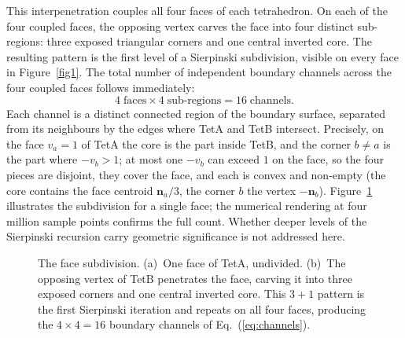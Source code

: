 \documentclass[twocolumn]{iopjournal}
\begin{document}
This interpenetration couples all four faces of each tetrahedron. On each
of the four coupled faces, the opposing vertex carves the face into four
distinct sub-regions: three exposed triangular corners and one central
inverted core. The resulting pattern is the
first level of a Sierpinski subdivision, visible on every face in
Figure~\ref{fig1}. The total number of independent boundary channels
across the four coupled faces follows immediately:
\begin{equation}
4 \;\text{faces} \times 4 \;\text{sub-regions} = 16 \;\text{channels}.
\label{eq:channels}
\end{equation}
Each channel is a distinct connected region of the boundary surface,
separated from its neighbours by the edges where TetA and TetB intersect.
Precisely, on the face $v_a = 1$ of TetA the core is the part inside TetB,
and the corner $b \neq a$ is the part where $-v_b > 1$; at most one
$-v_b$ can exceed $1$ on the face, so the four pieces are disjoint, they
cover the face, and each is convex and non-empty (the core contains the
face centroid $\mathbf{n}_a/3$, the corner $b$ the vertex $-\mathbf{n}_b$).
Figure~\ref{fig2} illustrates the subdivision for a single face; the
numerical rendering at four million sample points confirms the full count.
Whether deeper levels of the Sierpinski recursion carry geometric
significance is not addressed here.

\begin{figure}[t]
\centering
{}
\caption{The face subdivision. (a)~One face of TetA, undivided. (b)~The opposing vertex of TetB penetrates the face, carving it into three exposed corners and one central inverted core. This $3+1$ pattern is the first Sierpinski iteration and repeats on all four faces, producing the $4 \times 4 = 16$ boundary channels of Eq.~(\ref{eq:channels}).}
\label{fig2}
\end{figure}
\end{document}
